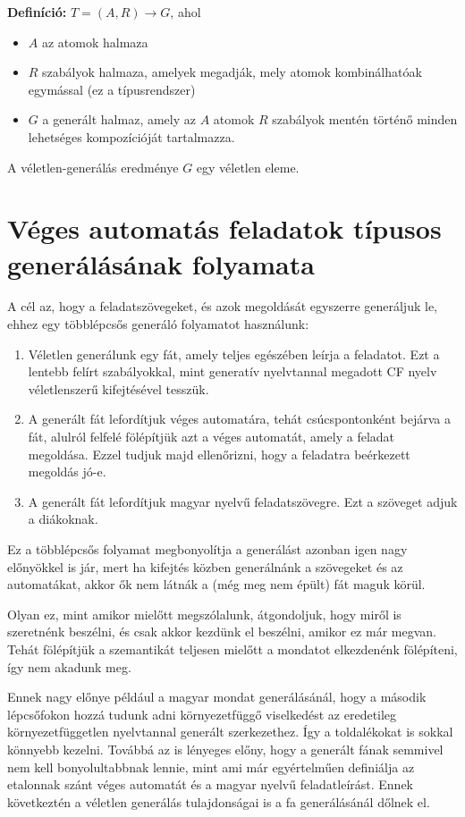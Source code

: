\documentclass[12pt]{report}
\theoremstyle{definition}
\begin{document}
\textbf{Definíció:} $T = (A,R)\rightarrow G$, ahol
\begin{itemize}
\item $A$ az atomok halmaza
\item $R$ szabályok halmaza, amelyek megadják, mely atomok kombinálhatóak egymással (ez a típusrendszer)
\item $G$ a generált halmaz, amely az $A$ atomok $R$ szabályok mentén történő minden lehetséges kompozícióját tartalmazza.
\end{itemize}	

A véletlen-generálás eredménye $G$ egy véletlen eleme.

\section{Véges automatás feladatok típusos generálásának folyamata} 
A cél az, hogy a feladatszövegeket, és azok megoldását egyszerre generáljuk le, ehhez egy többlépcsős generáló folyamatot használunk:
\begin{enumerate}
\item Véletlen generálunk egy fát, amely teljes egészében leírja a feladatot.
Ezt a lentebb felírt szabályokkal, mint generatív nyelvtannal megadott CF nyelv véletlenszerű kifejtésével tesszük.
\item A generált fát lefordítjuk véges automatára, tehát csúcspontonként bejárva a fát, alulról felfelé fölépítjük azt a véges automatát, amely a feladat megoldása. Ezzel tudjuk majd ellenőrizni, hogy a feladatra beérkezett megoldás jó-e.
\item A generált fát lefordítjuk magyar nyelvű feladatszövegre. Ezt a szöveget adjuk a diákoknak.
\end{enumerate}
Ez a többlépcsős folyamat megbonyolítja a generálást azonban igen nagy előnyökkel is jár, mert ha kifejtés közben generálnánk a szövegeket és az automatákat, akkor ők nem látnák a (még meg nem épült) fát maguk körül.

Olyan ez, mint amikor mielőtt megszólalunk, átgondoljuk, hogy miről is szeretnénk beszélni, és csak akkor kezdünk el beszélni, amikor ez már megvan. Tehát fölépítjük a szemantikát teljesen mielőtt a mondatot elkezdenénk fölépíteni, így nem akadunk meg.

Ennek nagy előnye például a magyar mondat generálásánál, hogy a második lépcsőfokon hozzá tudunk adni környezetfüggő viselkedést az eredetileg környezetfüggetlen nyelvtannal generált szerkezethez. Így a toldalékokat is sokkal könnyebb kezelni. Továbbá az is lényeges előny, hogy a generált fának semmivel nem kell bonyolultabbnak lennie, mint ami már egyértelműen definiálja az etalonnak szánt véges automatát és a magyar nyelvű feladatleírást. Ennek következtén a véletlen generálás tulajdonságai is a fa generálásánál dőlnek el.
\end{document}
